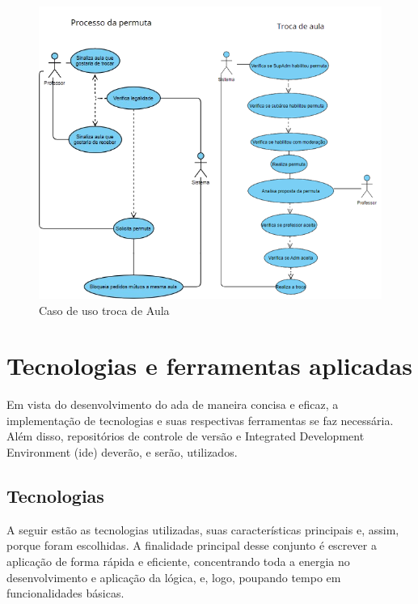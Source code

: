 \begin{figure}[h]
    \centering
    \includegraphics[width=1\textwidth]{anexos/CasosDeUso/CasoDeUso_ProcessoPermutaFULL.png}
    \caption{Caso de uso troca de Aula}
    \label{fig:figura4} 
\end{figure}

\section{Tecnologias e ferramentas aplicadas}

Em vista do desenvolvimento do \ac{ada} de maneira concisa e eficaz, a implementação de tecnologias e suas respectivas ferramentas se faz necessária. Além disso, repositórios de controle de versão e Integrated Development Environment (\ac{ide}) deverão, e serão, utilizados.

\subsection{Tecnologias}
A seguir estão as tecnologias utilizadas, suas características principais e, assim, porque foram escolhidas. A finalidade principal desse conjunto é escrever a aplicação de forma rápida e eficiente, concentrando toda a energia no desenvolvimento e aplicação da lógica, e, logo, poupando tempo em funcionalidades básicas.

